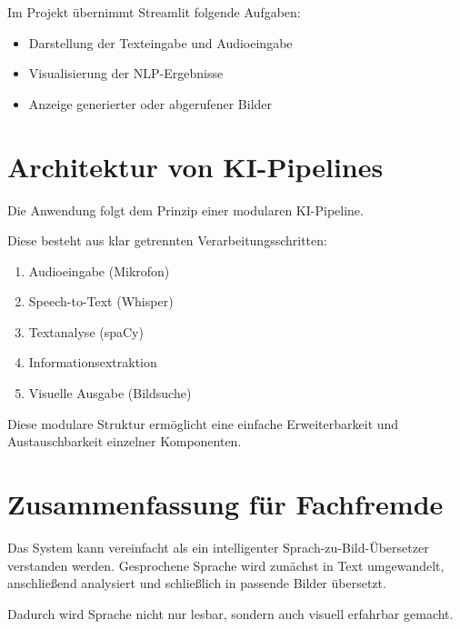 Im Projekt übernimmt Streamlit folgende Aufgaben:
\begin{itemize}
    \item Darstellung der Texteingabe und Audioeingabe
    \item Visualisierung der NLP-Ergebnisse
    \item Anzeige generierter oder abgerufener Bilder
\end{itemize}

\section{Architektur von KI-Pipelines}
Die Anwendung folgt dem Prinzip einer modularen KI-Pipeline.

Diese besteht aus klar getrennten Verarbeitungsschritten:
\begin{enumerate}
    \item Audioeingabe (Mikrofon)
    \item Speech-to-Text (Whisper)
    \item Textanalyse (spaCy)
    \item Informationsextraktion
    \item Visuelle Ausgabe (Bildsuche)
\end{enumerate}

Diese modulare Struktur ermöglicht eine einfache Erweiterbarkeit und Austauschbarkeit einzelner Komponenten.

\section{Zusammenfassung für Fachfremde}
Das System kann vereinfacht als ein intelligenter Sprach-zu-Bild-Übersetzer verstanden werden. Gesprochene Sprache wird zunächst in Text umgewandelt, anschließend analysiert und schließlich in passende Bilder übersetzt.

Dadurch wird Sprache nicht nur lesbar, sondern auch visuell erfahrbar gemacht.